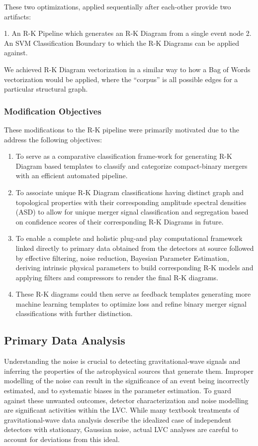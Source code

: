     These two optimizations, applied sequentially after each-other provide two artifacts:

    1. An R-K Pipeline which generates an R-K Diagram from a single event node
    2. An SVM Classification Boundary to which the R-K Diagrams can be applied against.

    We achieved R-K Diagram vectorization in a similar way to how a Bag of Words vectorization would be applied, where the ``corpus'' is all possible edges for a particular structural graph.

   \subsubsection{Modification Objectives}
    These modifications to the R-K pipeline were primarily motivated due to the address the following objectives:
    \begin{enumerate}
        \item To serve as a comparative classification frame-work for generating R-K Diagram based templates to classify and categorize compact-binary mergers with an efficient automated pipeline.
        \item To associate unique R-K Diagram classifications having distinct graph and topological properties with their  corresponding amplitude spectral densities (ASD) to allow for unique merger signal classification and segregation based on confidence scores of their corresponding R-K Diagrams in future.
        \item To enable a complete and holistic plug-and play computational framework linked directly to  primary data obtained from the detectors at source followed by effective filtering, noise reduction, Bayesian Parameter Estimation, deriving intrinsic physical parameters to build corresponding R-K models and applying filters and compressors to render the final R-K diagrams.
        \item These R-K diagrams could then serve as feedback templates generating more machine learning templates to optimize loss and refine binary merger signal classifications with further distinction.
    \end{enumerate}

    \subsection{Primary Data Analysis}

    Understanding the noise is crucial to detecting gravitational-wave signals and inferring the properties of the astrophysical sources that generate them. Improper modelling of the noise can result in the significance of an event being incorrectly estimated, and to systematic biases in the parameter estimation. To guard against these unwanted outcomes, detector characterization and noise modelling are significant activities within the LVC.\cite{00.5_GWDetectionNoiseCatalogue} While many textbook treatments of gravitational-wave data analysis describe the idealized case of independent detectors with stationary, Gaussian noise, actual LVC analyses are careful to account for deviations from this ideal.\cite{00.1_2012GWAnalysisFormalism} \cite{00.3_GravitationalWaveResearch}

